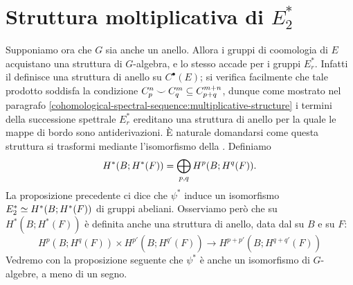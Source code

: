 \section{Struttura moltiplicativa di \texorpdfstring{$E^*_2$}{E*2}}
Supponiamo ora che $G$ sia anche un anello. Allora i gruppi di coomologia di $E$ acquistano una struttura di $G$-algebra, e lo stesso accade per i gruppi $E^\ast_r$. Infatti il \cupproduct{} definisce una struttura di anello su $C^\bullet(E)$; si verifica facilmente che tale prodotto soddisfa la condizione $C^n_p\mathbin{\smile} C^m_q\subseteq C^{m+n}_{p+q}$, dunque come mostrato nel paragrafo \ref{cohomological-spectral-sequence:multiplicative-structure} i termini della successione spettrale $E^\ast_r$ ereditano una struttura di anello per la quale le mappe di bordo sono antiderivazioni. È naturale domandarsi come questa struttura si trasformi mediante l'isomorfismo della .
Definiamo
$$
H^*(B;H^*(F))=\bigoplus_{p,q}H^p(B;H^q(F)).
$$
La proposizione precedente ci dice che $\psi^*$ induce un isomorfismo $E^\ast_2\simeq H^*(B;H^*(F))$ di gruppi abeliani.
Osserviamo però che su $H^*(B;H^*(F))$ è definita anche una struttura di anello, data dal \cupproduct{} su $B$ e su $F$:
$$
H^p(B;H^q(F))\times H^{p'}(B;H^{q'}(F))\longrightarrow H^{p+p'}(B;H^{q+q'}(F))
$$
Vedremo con la proposizione seguente che $\psi^*$ è anche un isomorfismo di $G$-algebre, a meno di un segno.

